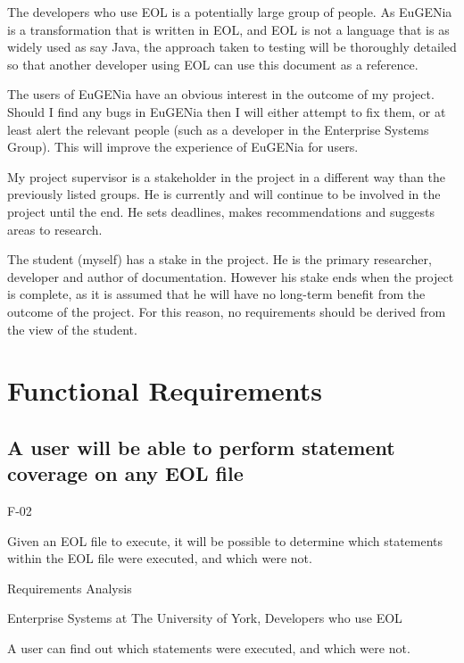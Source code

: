 The developers who use EOL is a potentially large group of people. As EuGENia is a transformation that is written in EOL, and EOL is not a language that is as widely used as say Java, the approach taken to testing will be thoroughly detailed so that another developer using EOL can use this document as a reference.

The users of EuGENia have an obvious interest in the outcome of my project. Should I find any bugs in EuGENia then I will either attempt to fix them, or at least alert the relevant people (such as a developer in the Enterprise Systems Group). This will improve the experience of EuGENia for users.

My project supervisor is a stakeholder in the project in a different way than the previously listed groups. He is currently and will continue to be involved in the project until the end. He sets deadlines, makes recommendations and suggests areas to research.

The student (myself) has a stake in the project. He is the primary researcher, developer and author of documentation. However his stake ends when the project is complete, as it is assumed that he will have no long-term benefit from the outcome of the project. For this reason, no requirements should be derived from the view of the student.

\section{Functional Requirements}

\subsection{A user will be able to perform statement coverage on any EOL file}
\begin{description}[style=sameline,leftmargin=4.5cm,nolistsep]
\item[\hspace*{0.3cm}Label] F-02
\item[\hspace*{0.3cm}Description] Given an EOL file to execute, it will be possible to determine which statements within the EOL file were executed, and which were not.
\item[\hspace*{0.3cm}Source] Requirements Analysis
\item[\hspace*{0.3cm}Stakeholders] Enterprise Systems at The University of York, Developers who use EOL
\item[\hspace*{0.3cm}Satisfiable Conditions] A user can find out which statements were executed, and which were not.
\end{description}

